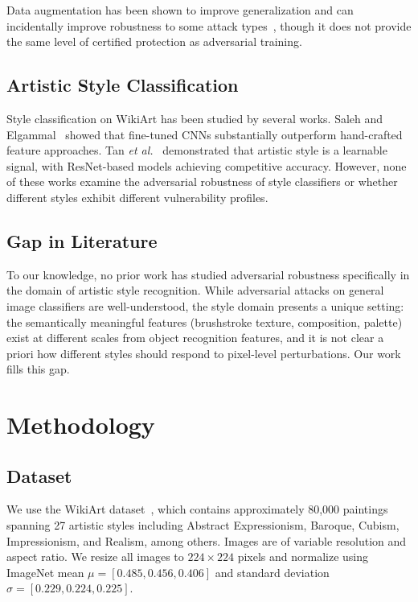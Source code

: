 \documentclass[conference]{IEEEtran}
\newcommand{\etal}{\textit{et al.}}
\begin{document}
Data augmentation has been shown to improve generalization and can incidentally improve robustness to some attack types~\cite{shorten2019survey}, though it does not provide the same level of certified protection as adversarial training.

\subsection{Artistic Style Classification}

Style classification on WikiArt has been studied by several works. Saleh and Elgammal~\cite{saleh2015wikiart} showed that fine-tuned CNNs substantially outperform hand-crafted feature approaches. Tan \etal~\cite{tan2016artgan} demonstrated that artistic style is a learnable signal, with ResNet-based models achieving competitive accuracy. However, none of these works examine the adversarial robustness of style classifiers or whether different styles exhibit different vulnerability profiles.

\subsection{Gap in Literature}

To our knowledge, no prior work has studied adversarial robustness specifically in the domain of artistic style recognition. While adversarial attacks on general image classifiers are well-understood, the style domain presents a unique setting: the semantically meaningful features (brushstroke texture, composition, palette) exist at different scales from object recognition features, and it is not clear a priori how different styles should respond to pixel-level perturbations. Our work fills this gap.

\section{Methodology}

\subsection{Dataset}

We use the WikiArt dataset~\cite{saleh2015wikiart}, which contains approximately 80,000 paintings spanning 27 artistic styles including Abstract Expressionism, Baroque, Cubism, Impressionism, and Realism, among others. Images are of variable resolution and aspect ratio. We resize all images to $224 \times 224$ pixels and normalize using ImageNet mean $\mu = [0.485, 0.456, 0.406]$ and standard deviation $\sigma = [0.229, 0.224, 0.225]$.
\end{document}
